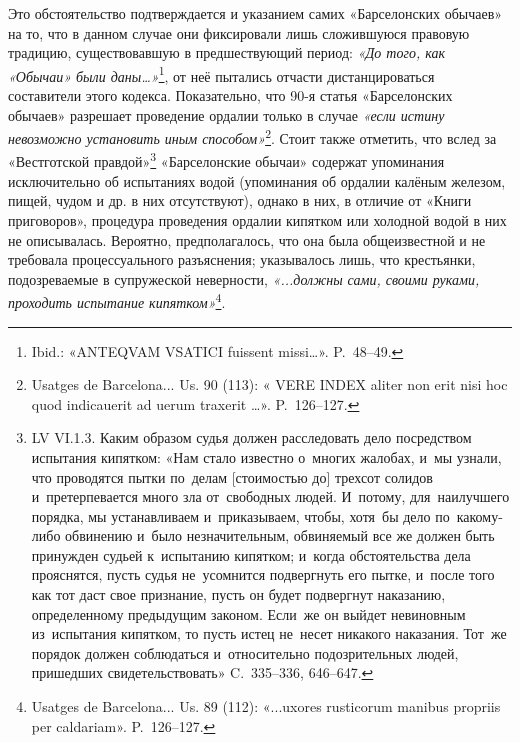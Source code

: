 Это обстоятельство подтверждается и указанием самих «Барселонских обычаев» на то, что в данном случае они фиксировали лишь сложившуюся правовую традицию, существовавшую в предшествующий период: \emph{«До того, как }\emph{«Обычаи» были дан}\emph{ы…»}\footnote{Ibid.: «ANTEQVAM VSATICI fuissent missi…». P.~48--49.}, от неё пытались отчасти дистанцироваться составители этого кодекса. Показательно, что 90-я статья «Барселонских обычаев» разрешает проведение ордалии только в случае \emph{«если истину невозможно установить иным способом»}\footnote{Usatges de Barcelona... Us. 90 (113): « VERE INDEX aliter non erit nisi hoc quod indicauerit ad uerum traxerit …». P.~126--127.}. Стоит также отметить, что вслед за «Вестготской правдой»\footnote{LV VI.1.3. Каким образом судья должен расследовать дело посредством испытания кипятком: «Нам стало известно о~многих жалобах, и~мы узнали, что проводятся пытки по~делам [стоимостью до] трехсот солидов и~претерпевается много зла от~свободных людей. И~потому, для~наилучшего порядка, мы устанавливаем и~приказываем, чтобы, хотя~бы дело по~какому-либо обвинению и~было незначительным, обвиняемый все же должен быть принужден судьей к~испытанию кипятком; и~когда обстоятельства дела прояснятся, пусть судья не~усомнится подвергнуть его пытке, и~после того как тот даст свое признание, пусть он будет подвергнут наказанию, определенному предыдущим законом. Если~же он выйдет невиновным из~испытания кипятком, то пусть истец не~несет никакого наказания. Тот~же порядок должен соблюдаться и~относительно подозрительных людей, пришедших свидетельствовать» C.~335--336, 646--647.} «Барселонские обычаи» содержат упоминания исключительно об испытаниях водой (упоминания об ордалии калёным железом, пищей, чудом и др. в них отсутствуют), однако в них, в отличие от «Книги приговоров», процедура проведения ордалии кипятком или холодной водой в них не описывалась. Вероятно, предполагалось, что она была общеизвестной и не требовала процессуального разъяснения; указывалось лишь, что крестьянки, подозреваемые в супружеской неверности, \emph{«...должны сами, своими руками, проходить испытание кипятком»}\footnote{Usatges de Barcelona... Us. 89 (112): «...uxores rusticorum manibus propriis per caldariam». P.~126--127.}.

